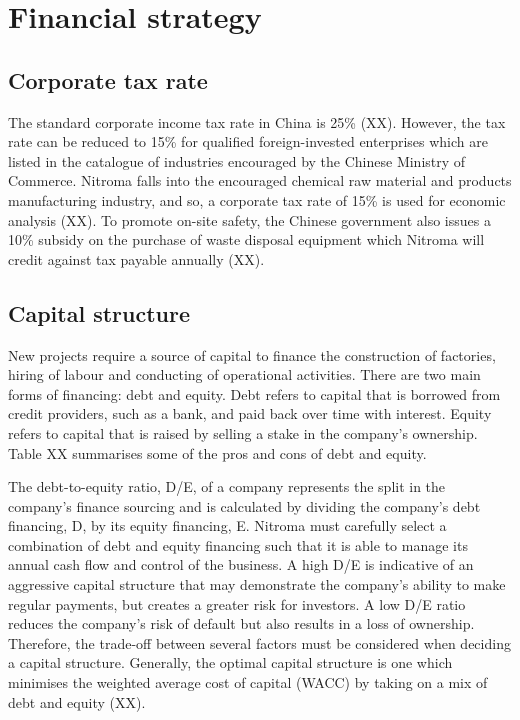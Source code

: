 \section{Financial strategy}
\subsection{Corporate tax rate}
\label{sec:tax}
The standard corporate income tax rate in China is 25\% (XX). However, the tax rate can be reduced to 15\% for qualified foreign-invested enterprises which are listed in the catalogue of industries encouraged by the Chinese Ministry of Commerce. Nitroma falls into the encouraged chemical raw material and products manufacturing industry, and so, a corporate tax rate of 15\% is used for economic analysis (XX). To promote on-site safety, the Chinese government also issues a 10\% subsidy on the purchase of waste disposal equipment which Nitroma will credit against tax payable annually (XX).

\subsection{Capital structure}
\label{sec:de-ratio}
New projects require a source of capital to finance the construction of factories, hiring of labour and conducting of operational activities. There are two main forms of financing: debt and equity. Debt refers to capital that is borrowed from credit providers, such as a bank, and paid back over time with interest. Equity refers to capital that is raised by selling a stake in the company’s ownership. Table XX summarises some of the pros and cons of debt and equity.

The debt-to-equity ratio, D/E, of a company represents the split in the company’s finance sourcing and is calculated by dividing the company’s debt financing, D, by its equity financing, E. Nitroma must carefully select a combination of debt and equity financing such that it is able to manage its annual cash flow and control of the business. A high D/E is indicative of an aggressive capital structure that may demonstrate the company’s ability to make regular payments, but creates a greater risk for investors. A low D/E ratio reduces the company’s risk of default but also results in a loss of ownership. Therefore, the trade-off between several factors must be considered when deciding a capital structure. Generally, the optimal capital structure is one which minimises the weighted average cost of capital (WACC) by taking on a mix of debt and equity (XX).


